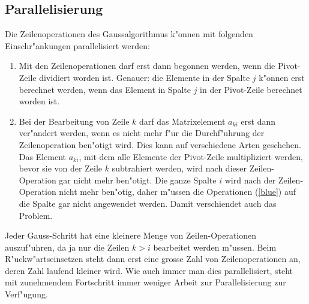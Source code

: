 \subsection{Parallelisierung}
Die Zeilenoperationen des Gaussalgorithmus k"onnen mit folgenden
Einschr"ankungen parallelisiert werden:
\begin{enumerate}
\item Mit den Zeilenoperationen darf erst dann begonnen werden,
wenn die Pivot-Zeile dividiert worden ist. Genauer: die Elemente
in der Spalte $j$ k"onnen erst berechnet werden, wenn das Element in Spalte
$j$ in der Pivot-Zeile berechnet worden ist.
\item Bei der Bearbeitung von Zeile $k$ darf das Matrixelement $a_{ki}$
erst dann ver"andert werden, wenn es nicht mehr f"ur die Durchf"uhrung
der Zeilenoperation ben"otigt wird. Dies kann auf verschiedene Arten
geschehen.
Das Element $a_{ki}$, mit dem alle Elemente
der Pivot-Zeile multipliziert werden, bevor sie von der Zeile $k$ subtrahiert
werden, wird nach dieser Zeilen-Operation gar nicht mehr ben"otigt.
Die ganze Spalte $i$ wird nach der Zeilen-Operation nicht mehr ben"otig,
daher m"ussen die Operationen (\ref{blue}) auf die Spalte gar nicht
angewendet werden. Damit verschiendet auch das Problem.
\end{enumerate}

Jeder Gauss-Schritt hat eine kleinere Menge von Zeilen-Operationen auszuf"uhren,
da ja nur die Zeilen $k>i$ bearbeitet werden m"ussen.
Beim R"uckw"artseinsetzen steht dann erst eine grosse Zahl von
Zeilenoperationen an, deren Zahl laufend kleiner wird.
Wie auch immer
man dies parallelisiert, steht mit zunehmendem Fortschritt immer
weniger Arbeit zur Parallelisierung zur Verf"ugung.

